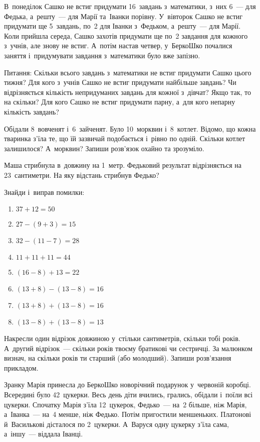 \problem
В~понеділок Сашко не встиг придумати 16~завдань з~математики,
з~них 6~--- для Федька, а~решту~--- для Марії та~Іванки порівну.
У~вівторок Сашко не встиг придумати ще 5~завдань,
по~2 для Іванки з~Федьком, а~решту~--- для Марії.
Коли прийшла середа, Сашко захотів придумати
ще по~2 завдання для кожного з~учнів, але знову не встиг.
А~потім настав четвер, у~БеркоШко почалися заняття
і~придумувати завдання з~математики було вже запізно.

Питання:
Скільки всього завдань з~математики не встиг придумати Сашко цього тижня?
Для кого з~учнів Сашко не встиг придумати найбільше завдань?
Чи відрізняється кількість непридуманих завдань для кожної з~дівчат?
Якщо так, то на скільки?
Для кого Сашко не встиг придумати парну, а~для кого непарну кількість завдань?


\problem
Обідали 8~вовченят і~6~зайченят. Було 10~морквин і~8~котлет.
Відомо, що кожна тваринка з'їла те, що їй зазвичай подобається
і~рівно по одній.
Скільки котлет залишилося? А~морквин? Запиши розв'язок охайно та зрозуміло.


\problem
Маша стрибнула в~довжину на 1~метр.
Федьковий результат відрізняється на 23~сантиметри.
На яку відстань стрибнув Федько?


\problem
Знайди і~виправ помилки:
\begin{multicols}{2}
    \begin{enumerate}
        \item $37 + 12 = 50$
        \item $27 - (9 + 3) = 15$
        \item $32 - (11 - 7) = 28$
        \item $11 + 11 + 11 = 44$
        \item $(16 - 8) + 13 = 22$
        \item $(13 + 8) - (13 - 8) = 16$
        \item $(13 + 8) + (13 - 8) = 16$
        \item $(13 - 8) + (13 - 8) = 13$
    \end{enumerate}
\end{multicols}


\problem
Накресли один відрізок довжиною у~стільки сантиметрів, скільки тобі років.
А~другий відрізок~--- скільки років твоєму братикові чи сестричці.
За малюнком визнач, на скільки років ти старший (або молодший).
Запиши розв’язання прикладом.


\problem
Зранку Марія принесла до БеркоШко новорічний подарунок у~червоній коробці.
Всередині було 42~цукерки.
Весь день діти вчились, грались, обідали і~поїли всі цукерки.
Спочатку Марія з’їла 12~цукерок, Федько~--- на~2 більше, ніж Марія,
а~Іванка~--- на~4 менше, ніж Федько.
Потім пригостили меншеньких.
Платонові й~Василькові дісталося по 2~цукерки.
А~Варуся одну цукерку з’їла сама, а~іншу~--- віддала Іванці.

